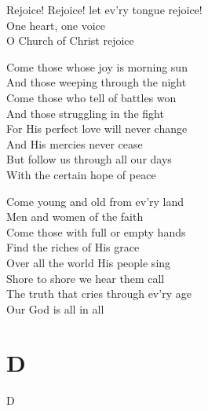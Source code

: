 \documentclass{beamer}
\begin{document}
{\begin{frame}{}
Rejoice! Rejoice! let ev'ry tongue rejoice!\\ 
One heart, one voice\\ 
O Church of Christ rejoice 

\end{frame}

\hypertarget{Come, people of the Risen King[]2}{}
\begin{frame}{}
\fontsize{ 18 }{ 23 }\selectfont

Come those whose joy is morning sun\\ 
And those weeping through the night\\ 
Come those who tell of battles won\\ 
And those struggling in the fight\\ 
For His perfect love will never change\\ 
And His mercies never cease\\ 
But follow us through all our days\\ 
With the certain hope of peace 

\end{frame}

\hypertarget{Come, people of the Risen King[]3}{}
\begin{frame}{}
\fontsize{ 18 }{ 23 }\selectfont

Come young and old from ev'ry land\\ 
Men and women of the faith\\ 
Come those with full or empty hands\\ 
Find the riches of His grace\\ 
Over all the world His people sing\\ 
Shore to shore we hear them call\\ 
The truth that cries through ev'ry age\\ 
Our God is all in all 

\end{frame}

}
\section{D}

\begin{frame}[t]{D}
\begin{columns}[t]

    


    


\end{columns}

\end{frame}
\end{document}
